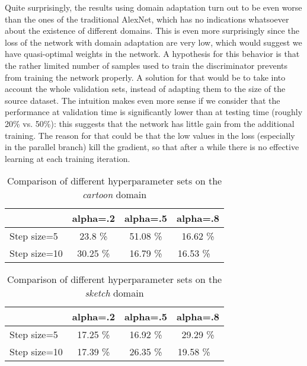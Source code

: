 \documentclass[11pt,twoside,a4paper]{article}
\begin{document}
Quite surprisingly, the results using domain adaptation turn out to be even worse than the ones of the traditional AlexNet, which has no indications whatsoever about the existence of different domains. This is even more surprisingly since the loss of the network with domain adaptation are very low, which would suggest we have quasi-optimal weights in the network. A hypothesis for this behavior is that the rather limited number of samples used to train the discriminator prevents from training the network properly. A solution for that would be to take into account the whole validation sets, instead of adapting them to the size of the source dataset. The intuition makes even more sense if we consider that the performance at validation time is significantly lower than at testing time (roughly 20\% vs. 50\%): this suggests that the network has little gain from the additional training. The reason for that could be that the low values in the loss (especially in the parallel branch) kill the gradient, so that after a while there is no effective learning at each training iteration. 
\begin{table}[!h]
  \begin{adjustwidth}{-.5in}{-.5in}
  \begin{center}
    \begin{tabular}{l | c | c | c}
        & alpha=.2 & alpha=.5 & alpha=.8 \\
      \hline
	Step size=5 & 23.8 \% & 51.08 \% & 16.62 \% \\
	Step size=10 & 30.25 \% & 16.79 \% & 16.53 \% \
    \end{tabular}
    \caption{Comparison of different hyperparameter sets on the \textit{cartoon} domain}
    \label{da:cartoon}
  \end{center}
  \end{adjustwidth}
\end{table}

\begin{table}[!h]
  \begin{adjustwidth}{-.5in}{-.5in}
  \begin{center}
    \begin{tabular}{l | c | c | c}
        & alpha=.2 & alpha=.5 & alpha=.8 \\
      \hline
	Step size=5 & 17.25 \% & 16.92 \% & 29.29 \% \\
	Step size=10 & 17.39 \% & 26.35 \% & 19.58 \% \
    \end{tabular}
    \caption{Comparison of different hyperparameter sets on the \textit{sketch} domain}
    \label{da:sketch}
  \end{center}
  \end{adjustwidth}
\end{table}
\end{document}
